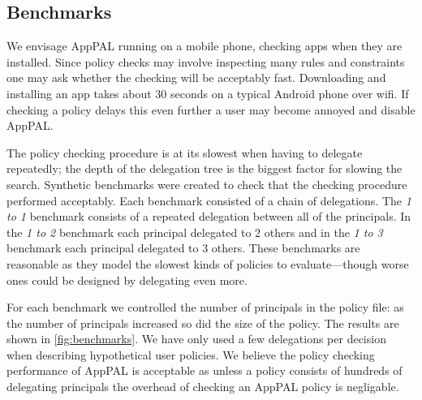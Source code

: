 \documentclass[]{llncs}
\begin{document}
\subsection{Benchmarks}
\label{ssec:benchmarks}

We envisage AppPAL running on a mobile phone, checking apps when they are installed.
Since policy checks may involve inspecting many rules and constraints one may ask whether the checking will be acceptably fast.
Downloading and installing an app takes about 30 seconds on a typical Android phone over wifi.
If checking a policy delays this even further a user may become annoyed and disable AppPAL.

The policy checking procedure is at its slowest when having to delegate repeatedly;
   the depth of the delegation tree is the biggest factor for slowing the search.
Synthetic benchmarks were created to check that the checking procedure performed acceptably.
Each benchmark consisted of a chain of delegations.
The \emph{1 to 1} benchmark consists of a repeated delegation between all of the principals.
In the \emph{1 to 2} benchmark each principal delegated to 2 others and in the \emph{1 to 3} benchmark each principal delegated to 3 others.
These benchmarks are reasonable as they model the slowest kinds of policies to evaluate---though worse ones could be designed by delegating even more.

For each benchmark we controlled the number of principals in the policy file:
  as the number of principals increased so did the size of the policy.
The results are shown in \autoref{fig:benchmarks}.
We have only used a few delegations per decision when describing hypothetical user policies.
We believe the policy checking performance of AppPAL is acceptable as unless a policy consists of hundreds of delegating principals the overhead of checking an AppPAL policy is negligable.
\end{document}
